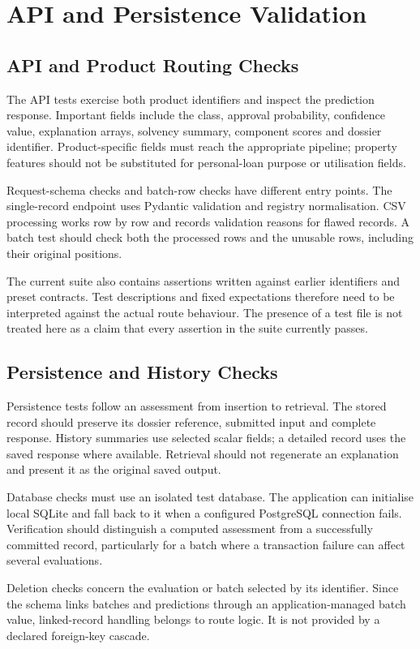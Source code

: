 \section{API and Persistence Validation}
\subsection{API and Product Routing Checks}
The API tests exercise both product identifiers and inspect the prediction response. Important fields include the class, approval probability, confidence value, explanation arrays, solvency summary, component scores and dossier identifier. Product-specific fields must reach the appropriate pipeline; property features should not be substituted for personal-loan purpose or utilisation fields.

Request-schema checks and batch-row checks have different entry points. The single-record endpoint uses Pydantic validation and registry normalisation. CSV processing works row by row and records validation reasons for flawed records. A batch test should check both the processed rows and the unusable rows, including their original positions.

The current suite also contains assertions written against earlier identifiers and preset contracts. Test descriptions and fixed expectations therefore need to be interpreted against the actual route behaviour. The presence of a test file is not treated here as a claim that every assertion in the suite currently passes.

\subsection{Persistence and History Checks}
Persistence tests follow an assessment from insertion to retrieval. The stored record should preserve its dossier reference, submitted input and complete response. History summaries use selected scalar fields; a detailed record uses the saved response where available. Retrieval should not regenerate an explanation and present it as the original saved output.

Database checks must use an isolated test database. The application can initialise local SQLite and fall back to it when a configured PostgreSQL connection fails. Verification should distinguish a computed assessment from a successfully committed record, particularly for a batch where a transaction failure can affect several evaluations.

Deletion checks concern the evaluation or batch selected by its identifier. Since the schema links batches and predictions through an application-managed batch value, linked-record handling belongs to route logic. It is not provided by a declared foreign-key cascade.

